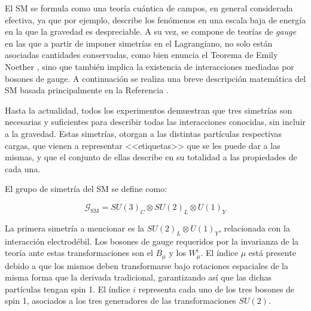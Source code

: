 El SM se formula como una teoría cuántica de campos, en general considerada efectiva, ya que por ejemplo, describe los fenómenos en una escala baja de energía en la que la gravedad es despreciable. A su vez, se compone de teorías de \textit{gauge} en las que a partir de imponer simetrías en el Lagrangiano, no solo están asociadas cantidades conservadas, como bien enuncia el Teorema de Emily Noether \cite{Noether1918}, sino que también implica la existencia de interacciones mediadas por bosones de gauge. A continuación se realiza una breve descripción matemática del SM basada principalmente en la Referencia \cite{gkane}.

Hasta la actualidad, todos los experimentos demuestran que tres simetrías son necesarias y suficientes para describir todas las interacciones conocidas, sin incluir a la gravedad. Estas simetrías, otorgan a las distintas partículas respectivas cargas, que vienen a representar <<etiquetas>> que se les puede dar a las mismas, y que el conjunto de ellas describe en su totalidad a las propiedades de cada una.

El grupo de simetría del SM se define como:

\begin{equation}
	\mathcal{G}_{\text{SM}} = SU(3)_C \otimes SU(2)_L \otimes U(1)_Y
\end{equation}

La primera simetría a mencionar es la $SU(2)_L \otimes U(1)_Y$, relacionada con la interacción electrodébil. Los bosones de gauge requeridos por la invarianza de la teoría ante estas transformaciones son el $B_{\mu}$ y los $W_{\mu}^{i}$. El índice $\mu$ está presente debido a que los mismos deben transformarse bajo rotaciones espaciales de la misma forma que la derivada tradicional, garantizando así que las dichas partículas tengan spin 1. El índice $i$ representa cada uno de los tres bosones de spin 1, asociados a los tres generadores de las transformaciones $SU(2)$.


